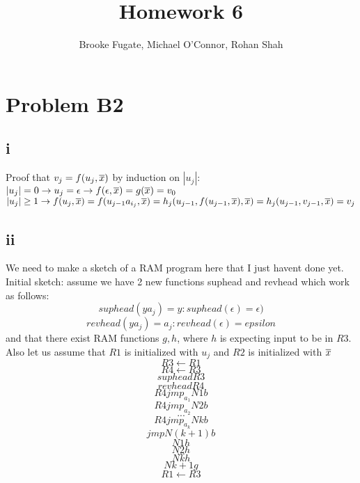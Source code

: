\documentclass[12pt]{article}
\begin{document}
\pagestyle{plain}
\titleformat{\subsection}[runin]
  {\normalfont\large\bfseries}{\thesubsection}{1em}{}
\titleformat{\subsubsection}[runin]
  {\bfseries}{}{1em}{}

\title{Homework 6}
\author{Brooke Fugate, Michael O'Connor, Rohan Shah}
\date{}

\maketitle

\section*{Problem B2}
\subsection*{i}
Proof that $v_j = f(u_j, \overline{x})$ by induction on $|u_j|$: \newline
$|u_j| = 0 \rightarrow u_j = \epsilon \rightarrow f(\epsilon, \overline{x}) = g(\overline{x}) = v_0$\newline
$|u_j| \ge 1 \rightarrow f(u_j, \overline{x}) = f(u_{j-1}a_{i_j}, \overline{x}) = h_j(u_{j-1}, f(u_{j-1}, \overline{x}), \overline{x}) = h_j(u_{j-1}, v_{j-1}, \overline{x}) = v_j$

\subsection*{ii}
We need to make a sketch of a RAM  program here that I just havent done yet. Initial sketch:\newline
assume we have 2 new functions suphead and revhead which work as follows: $$suphead(ya_j) = y : suphead(\epsilon) = \epsilon)$$ $$revhead(ya_j) = a_j : revhead(\epsilon) = epsilon$$ and that there exist RAM functions $g , h$, where $h$ is expecting input to be in $R3$.  Also let us assume that $R1$ is initialized with $u_j$ and $R2$ is initialized with $\overline{x}$
$$R3 \leftarrow R1$$
$$R4 \leftarrow R3$$
$$suphead R3$$
$$revhead R4$$
$$R4 jmp_{a_1} N1b$$
$$R4 jmp_{a_2} N2b$$
$$...$$
$$R4 jmp_{a_k} Nkb$$
$$jmp N(k+1)b$$
$$N1		h$$
$$N2		h$$
$$...$$
$$Nk		h$$
$$Nk+1	g$$
$$R1 \leftarrow R3$$
\end{document}
